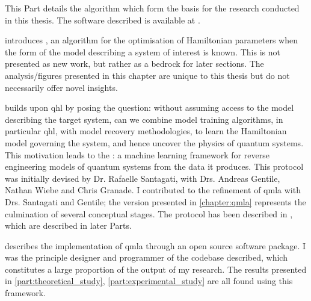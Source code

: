 This Part details the algorithm which form the basis for the research conducted in this thesis. 
The software described is available at \cite{flynn2021QMLA, qmla_docs}.

\par 
\vspace{1cm}

 introduces , an algorithm for the optimisation of Hamiltonian parameters
    when the form of the model describing a system of interest is known. 
    This is not presented as new work, but rather as a bedrock for later sections. 
    The analysis/figures presented in this chapter are unique to this thesis but do not necessarily offer novel insights. 
\par 
\vspace{1cm}
 builds upon \gls{qhl} by posing the question: 
    without assuming access to the model describing the target system, can we combine model training algorithms, 
    in particular \gls{qhl}, with model recovery methodologies, to learn the Hamiltonian model 
    governing the system, and hence uncover the physics of quantum systems. 
    This motivation leads to the : 
    a machine learning framework for reverse engineering models of quantum systems from the data it produces. 
    This protocol was initially devised by Dr. Rafaelle Santagati, with Drs. Andreas Gentile, Nathan Wiebe and Chris Granade. 
    I contributed to the refinement of \gls{qmla} with Drs. Santagati and Gentile; 
    the version presented in \cref{chapter:qmla} represents the culmination of several conceptual stages. 
    The protocol has been described in \cite{gentile2020learning}, which are described in later Parts. 
\par
\vspace{1cm}

 describes the implementation of \gls{qmla} through an open source software package. 
I was the principle designer and programmer of the codebase described, which constitutes a large proportion of the output of my research. 
The results presented in \cref{part:theoretical_study}, \cref{part:experimental_study} are all found using this framework. 
